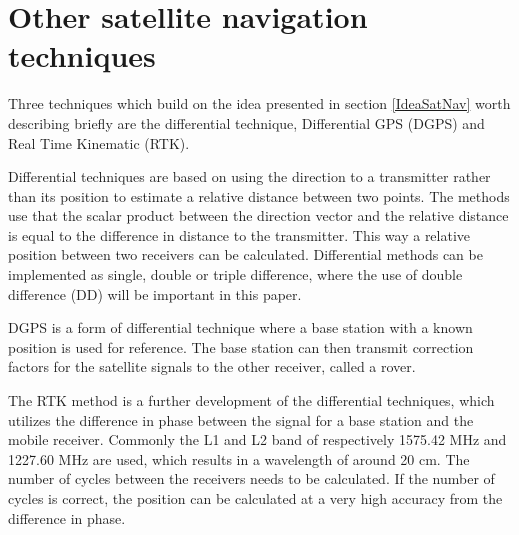 \section{Other satellite navigation techniques}\label{DGPSRTK}
Three techniques which build on the idea presented in section \ref{IdeaSatNav} worth describing briefly are the differential technique, Differential GPS (DGPS) and Real Time Kinematic (RTK). 
\par
Differential techniques are based on using the direction to a transmitter rather than its position to estimate a relative distance between two points. The methods use that the scalar product between the direction vector and the relative distance is equal to the difference in distance to the transmitter. This way a relative position between two receivers can be calculated. Differential methods can be implemented as single, double or triple difference, where the use of double difference (DD) will be important in this paper. 
\par 
DGPS is a form of differential technique where a base station with a known position is used for reference. The base station can then transmit correction factors for the satellite signals to the other receiver, called a rover.
\par
The RTK method is a further development of the differential techniques, which utilizes the difference in phase between the signal for a base station and the mobile receiver. Commonly the L1 and L2 band of respectively 1575.42 MHz and 1227.60 MHz are used, which results in a wavelength of around 20 cm. The number of cycles between the receivers needs to be calculated. If the number of cycles is correct, the position can be calculated at a very high accuracy from the difference in phase. 

